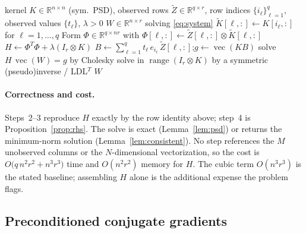 \documentclass[12pt]{article}
\DeclareMathOperator{\vecop}{vec}
\DeclareMathOperator{\range}{range}
\newcommand{\bR}{\mathbb{R}}
\newcommand{\tZ}{\tilde Z}
\newcommand{\tK}{\tilde K}
\begin{document}
\begin{algorithm}[H]
\caption{Direct symmetric solve of the mode-$k$ RKHS subproblem}
\begin{algorithmic}[1]
\Require kernel $K\in\bR^{n\times n}$ (sym.\ PSD), observed rows $\tZ\in\bR^{q\times r}$,
row indices $\{i_\ell\}_{\ell=1}^q$, observed values $\{t_\ell\}$, $\lambda>0$
\Ensure $W\in\bR^{n\times r}$ solving \eqref{eq:system}
\State $\tK[\ell,:]\gets K[i_\ell,:]$ for $\ell=1,\dots,q$ 
\State Form $\Phi\in\bR^{q\times nr}$ with $\Phi[\ell,:]\gets \tZ[\ell,:]\otimes\tK[\ell,:]$ 
\State $H\gets \Phi^{T}\Phi+\lambda(I_r\otimes K)$ 
\State $B\gets \sum_{\ell=1}^q t_\ell\,e_{i_\ell}\,\tZ[\ell,:]$;\quad $g\gets\vecop(KB)$ 
 \State solve $H\,\vecop(W)=g$ by Cholesky 
\Else \State solve in $\range(I_r\otimes K)$ by a symmetric (pseudo)inverse / LDL$^{T}$ 
\EndIf
\State \Return $W$
\end{algorithmic}
\end{algorithm}

\paragraph{Correctness and cost.}
Steps~2--3 reproduce $H$ exactly by the row identity above; step~4 is
Proposition~\ref{prop:rhs}. The solve is exact (Lemma~\ref{lem:psd}) or returns the
minimum-norm solution (Lemma~\ref{lem:consistent}). No step references the $M$
unobserved columns or the $N$-dimensional vectorization, so the cost is
$O\!\big(q\,n^2r^2+n^3r^3\big)$ time and $O(n^2r^2)$ memory for $H$. The cubic term
$O(n^3r^3)$ is the stated baseline; assembling $H$ alone is the additional expense the
problem flags.

\subsection{Preconditioned conjugate gradients}
\end{document}
